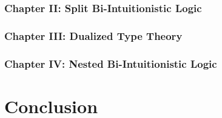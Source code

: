 
\subsubsection{Chapter II: Split Bi-Intuitionistic Logic}
\label{subsec:split_bi-intuitionistic_logic}


\subsubsection{Chapter III: Dualized Type Theory}
\label{subsubsec:dualized_type_theory}


\subsubsection{Chapter IV: Nested Bi-Intuitionistic Logic}
\label{subsec:nested_bi-intuitionistic_logic}


\section{Conclusion}
\label{sec:conclusion}


 

